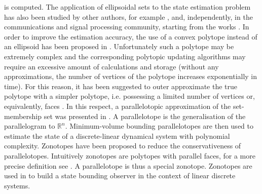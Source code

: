 \documentclass[twocolumn]{autart}
\newcommand{\DP}[1]{{#1}}
\begin{document}
is computed. The application of ellipsoidal sets to the state estimation
problem has also been studied by other authors, for example \cite{kuntsevich1992guaranteed,savkin1998robust},
{and, independently, in the communications and signal
processing community, starting from the works  \cite{Fogel1982229,deller1989implementing,DELLER1989301,Deller1994}.}
In order to improve the estimation accuracy,
the use of a convex polytope instead of an ellipsoid has been proposed in \cite{Lahanier89,mo1990fast}.
Unfortunately such a polytope may be extremely complex and the corresponding polytopic updating algorithms
 may require an excessive amount of calculations and storage (without any approximations, the number of vertices of the polytope
increases exponentially in time). For this reason, it has been suggested  to outer approximate the true polytope with a simpler polytope,
i.e. possessing a limited number of vertices or, equivalently, faces \cite{broman1990compact}. In this respect, a parallelotopic approximation of the set-membership set was presented in \cite{chisci1996recursive,chisci1998block}.
A parallelotope is  \DP{the} generalisation of \DP{the}  parallelogram to $\mathbb{R}^n$.
Minimum-volume bounding parallelotopes are then used to
estimate the state of a discrete-linear dynamical system
with polynomial complexity.
Zonotopes have been proposed to reduce the conservativeness of parallelotopes.
Intuitively zonotopes are polytopes with parallel faces, for a more precise
definition see \cite[Ch. 2]{le2013zonotopes}. A  parallelotope is thus a special  zonotope.
Zonotopes are used in  \cite{puig2003worst,combastel2003state,le2011new}
to build a state bounding observer in the context of linear discrete systems.
\end{document}
